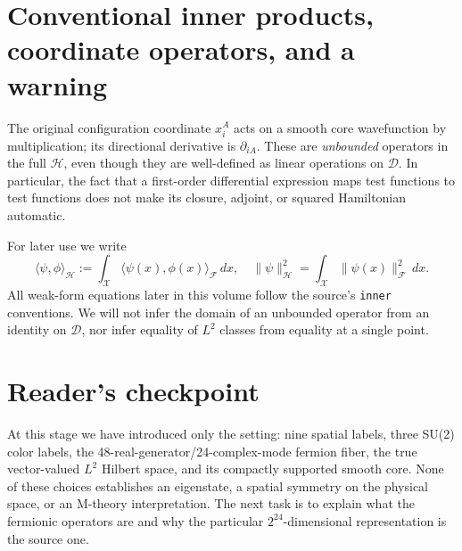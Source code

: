 \section{Conventional inner products, coordinate operators, and a warning}
The original configuration coordinate $x_i^A$ acts on a smooth core
wavefunction by multiplication; its directional derivative is
$\partial_{iA}$. These are \emph{unbounded} operators in the full
$\mathscr H$, even though they are well-defined as linear operations on
$\mathscr D$. In particular, the fact that a first-order differential
expression maps test functions to test functions does not make its closure,
adjoint, or squared Hamiltonian automatic.

For later use we write
\begin{equation}\label{eq:original-inner}
 \langle \psi,\phi\rangle_{\mathscr H}
 :=\int_{\mathcal X}\langle \psi(x),\phi(x)\rangle_{\mathcal F}\,dx,
 \quad \|\psi\|_{\mathscr H}^2
 =\int_{\mathcal X}\|\psi(x)\|_{\mathcal F}^2\,dx.
\end{equation}
All weak-form equations later in this volume follow the source's
\texttt{inner} conventions. We will not infer the domain of an unbounded
operator from an identity on $\mathscr D$, nor infer equality of $L^2$
classes from equality at a single point.

\section{Reader's checkpoint}
At this stage we have introduced only the setting: nine spatial labels,
three SU(2) color labels, the 48-real-generator/24-complex-mode fermion
fiber, the true vector-valued $L^2$ Hilbert space, and its compactly
supported smooth core. None of these choices establishes an eigenstate,
a spatial symmetry on the physical space, or an M-theory interpretation.
The next task is to explain what the fermionic operators are and why the
particular $2^{24}$-dimensional representation is the source one.
